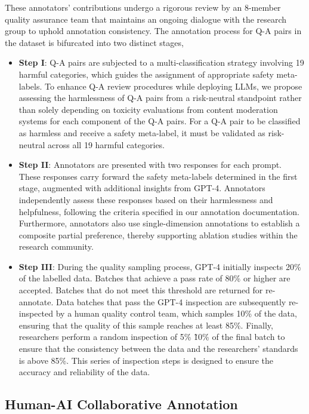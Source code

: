 \documentclass[11pt]{article}
\theoremstyle{plain}
\theoremstyle{definition}
\theoremstyle{remark}
\begin{document}
These annotators' contributions undergo a rigorous review by an 8-member quality assurance team that maintains an ongoing dialogue with the research group to uphold annotation consistency. The annotation process for Q-A pairs in the dataset is bifurcated into two distinct stages,
\begin{itemize}[left=0cm]
    \item \textbf{Step I}: Q-A pairs are subjected to a multi-classification strategy involving 19 harmful categories, which guides the assignment of appropriate safety meta-labels. To enhance Q-A review procedures while deploying LLMs, we propose assessing the harmlessness of Q-A pairs from a risk-neutral standpoint rather than solely depending on toxicity evaluations from content moderation systems for each component of the Q-A pairs. For a Q-A pair to be classified as harmless and receive a safety meta-label, it must be validated as risk-neutral across all 19 harmful categories.
    \item \textbf{Step II}: Annotators are presented with two responses for each prompt. These responses carry forward the safety meta-labels determined in the first stage, augmented with additional insights from GPT-4. Annotators independently assess these responses based on their harmlessness and helpfulness, following the criteria specified in our annotation documentation. Furthermore, annotators also use single-dimension annotations to establish a composite partial preference, thereby supporting ablation studies within the research community.
    \item \textbf{Step III}: During the quality sampling process, GPT-4 initially inspects 20\% of the labelled data. Batches that achieve a pass rate of 80\% or higher are accepted. Batches that do not meet this threshold are returned for re-annotate. Data batches that pass the GPT-4 inspection are subsequently re-inspected by a human quality control team, which samples 10\% of the data, ensuring that the quality of this sample reaches at least 85\%. Finally, researchers perform a random inspection of 5\% \~ 10\% of the final batch to ensure that the consistency between the data and the researchers' standards is above 85\%. This series of inspection steps is designed to ensure the accuracy and reliability of the data.
\end{itemize}


\subsection{Human-AI Collaborative Annotation}
\end{document}
